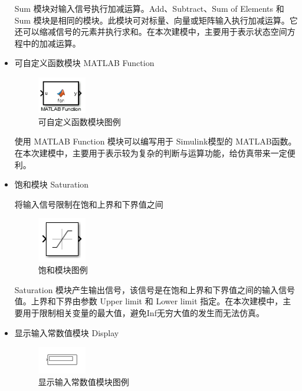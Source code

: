 \begin{itemize}
	Sum 模块对输入信号执行加减运算。Add、Subtract、Sum of Elements 和 Sum 模块是相同的模块。此模块可对标量、向量或矩阵输入执行加减运算。它还可以缩减信号的元素并执行求和。在本次建模中，主要用于表示状态空间方程中的加减运算。
	
	\item 可自定义函数模块 MATLAB Function
	
	\begin{figure}[H]
		\centering
		\includegraphics[width=0.2\textwidth]{fig/simulink/matlab_function_block.png}
		\caption{可自定义函数模块图例}\label{fig:matlab_function_block}
	\end{figure}
	
	使用 MATLAB Function 模块可以编写用于 Simulink模型的 MATLAB函数。在本次建模中，主要用于表示较为复杂的判断与运算功能，给仿真带来一定便利。
	
	\item 饱和模块 Saturation
	
	将输入信号限制在饱和上界和下界值之间
	
	\begin{figure}[H]
		\centering
		\includegraphics[width=0.2\textwidth]{fig/simulink/saturation_block.png}
		\caption{饱和模块图例}\label{fig:saturation_block}
	\end{figure}
	
	Saturation 模块产生输出信号，该信号是在饱和上界和下界值之间的输入信号值。上界和下界由参数 Upper limit 和 Lower limit 指定。在本次建模中，主要用于限制相关变量的最大值，避免Inf无穷大值的发生而无法仿真。
	
	\item 显示输入常数值模块 Display
	
	\begin{figure}[H]
		\centering
		\includegraphics[width=0.2\textwidth]{fig/simulink/display_block.png}
		\caption{显示输入常数值模块图例}\label{fig:display_block}
	\end{figure}
	

\end{itemize}
